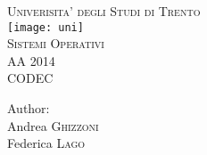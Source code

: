 \begin{titlepage}
\begin{center}

\vspace*{1cm}
        
\textsc{\LARGE Univerisita' degli Studi di Trento}\\[1.5cm] %
\texttt{[image: uni]}\\[1.5cm]
\textsc{\Large Sistemi Operativi}\\[0.5cm] %
\textsc{\large AA 2014}\\[0.5cm] %

\vspace{1.5cm}
\textsc{\LARGE CODEC}
\vspace{1.5cm}
        
\Large {Author:}\\
Andrea \textsc{Ghizzoni}\\
Federica \textsc{Lago}\\[3cm]        

        
\vfill
        
        
\end{center}
\end{titlepage}